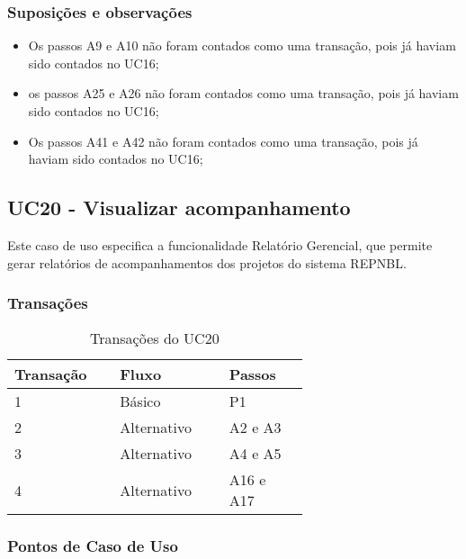   \subsubsection{Suposições e observações}
  
  \begin{itemize}
   \item Os passos A9 e A10 não foram contados como uma transação, pois já haviam sido contados no UC16;	
   \item os passos A25 e A26 não foram contados como uma transação, pois já haviam sido contados no UC16;	
   \item Os passos A41 e A42 não foram contados como uma transação, pois já haviam sido contados no UC16;
  \end{itemize}
  
  \vfill
  
\pagebreak
\subsection{UC20 - Visualizar acompanhamento}
  
  Este caso de uso especifica a funcionalidade Relatório Gerencial, que permite gerar 
  relatórios de acompanhamentos dos projetos do sistema REPNBL.
  
  \subsubsection{Transações}

  \begin{table*}[!h]
  \centering
  \caption{Transações do UC20}
  \label{Rotulo}
    \begin{tabular}{|p{0.20\linewidth}|p{0.25\linewidth}|p{0.20\linewidth}|}
    \hline
    \textbf{Transação} & \textbf{Fluxo} & \textbf{Passos} \\ 
    \hline
    1 & Básico & P1\\
    \hline
    2 & Alternativo & A2 e A3 \\
    \hline
    3 & Alternativo & A4 e A5 \\
    \hline
    4 & Alternativo & A16 e A17\\
    \hline
    \end{tabular}
  \end{table*}

  \subsubsection{Pontos de Caso de Uso}

